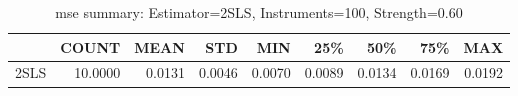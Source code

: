 \begin{table}[ht]
\centering
\caption{mse summary: Estimator=2SLS, Instruments=100, Strength=0.60}
\begin{tabular}{lrrrrrrrr}
\toprule
 & COUNT & MEAN & STD & MIN & 25\% & 50\% & 75\% & MAX \\
\midrule
2SLS & 10.0000 & 0.0131 & 0.0046 & 0.0070 & 0.0089 & 0.0134 & 0.0169 & 0.0192 \\
\bottomrule
\end{tabular}
\end{table}
